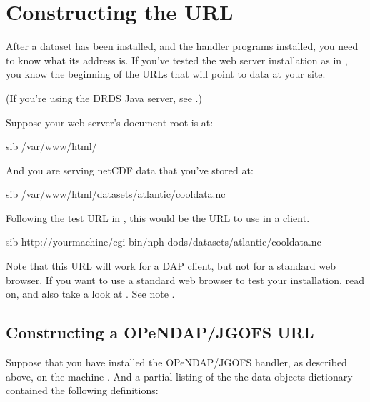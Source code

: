 \documentclass{dods-book}
\begin{document}
 

\chapter{Constructing the URL}

After a dataset has been installed, and the handler programs installed,
you need to know what its address is.  If you've tested the web server
installation as in , you know the
beginning of the URLs that will point to data at your site.

(If you're using the DRDS Java server, see .)

Suppose your web server's document root is at:

\begin{vcode}{sib}
/var/www/html/
\end{vcode}

And you are serving netCDF data that you've stored at:

\begin{vcode}{sib}
/var/www/html/datasets/atlantic/cooldata.nc
\end{vcode}

Following the test URL in , this would
be the URL to use in a client.

\begin{vcode}{sib}
http://yourmachine/cgi-bin/nph-dods/datasets/atlantic/cooldata.nc
\end{vcode}

Note that this URL will work for a DAP client, but not for a standard
web browser. If you want to use a standard web browser to test your
installation, read on, and also take a look at \DODSquick . See note
.


\section{Constructing a OPeNDAP/JGOFS URL}

Suppose that you have installed the OPeNDAP/JGOFS handler, as described
above, on the machine .  And a partial listing
of the the data objects dictionary contained the following
definitions:
\end{document}

